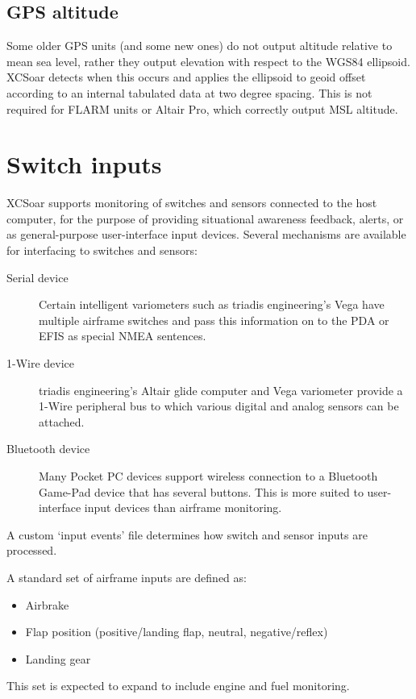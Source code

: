 \documentclass[a4paper,12pt]{refrep}
\begin{document}
\subsection*{GPS altitude}

Some older GPS units (and some new ones) do not output altitude
relative to mean sea level, rather they output elevation with respect
to the WGS84 ellipsoid.  XCSoar detects when this occurs and applies
the ellipsoid to geoid offset according to an internal tabulated data
at two degree spacing.  This is not required for FLARM units or Altair
Pro, which correctly output MSL altitude.

\section{Switch inputs}

XCSoar supports monitoring of switches and sensors connected to the
host computer, for the purpose of providing situational awareness
feedback, alerts, or as general-purpose user-interface input devices.
Several mechanisms are available for interfacing to switches and
sensors:
\begin{description}
\item[Serial device]  Certain intelligent variometers such as
 triadis engineering's Vega have multiple airframe switches
 and pass this information on to the PDA or EFIS as special
 NMEA sentences.
\item[1-Wire device]  triadis engineering's Altair glide computer
 and Vega variometer provide a 1-Wire peripheral bus to which
 various digital and analog sensors can be attached.
\item[Bluetooth device]  Many Pocket PC devices support wireless
 connection to a Bluetooth Game-Pad device that has several buttons.
 This is more suited to user-interface input devices than airframe
 monitoring.
\end{description}

A custom `input events' file determines how switch and sensor
inputs are processed.

A standard set of airframe inputs are defined as:
\begin{itemize}
\item Airbrake
\item Flap position (positive/landing flap, neutral, negative/reflex)
\item Landing gear
\end{itemize}

This set is expected to expand to include engine and fuel monitoring.
\end{document}
